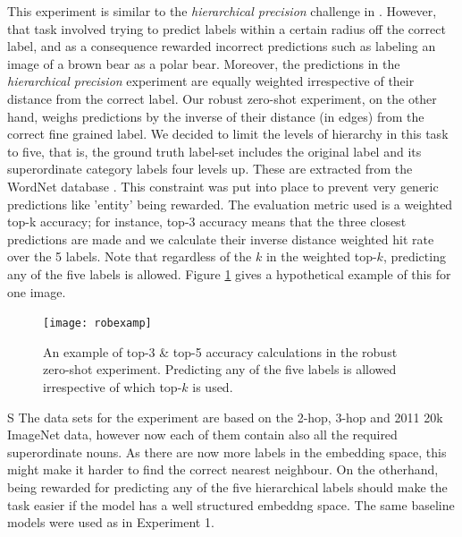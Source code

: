 \documentclass[12pt]{report}
\begin{document}
This experiment is similar to the \textit{hierarchical precision} challenge in \cite{Frome2013}. However, that task involved trying to predict labels within a certain radius off the correct label, and as a consequence rewarded incorrect predictions such as labeling an image of a brown bear as a polar bear. Moreover, the predictions in the \textit{hierarchical precision} experiment are equally weighted irrespective of their distance from the correct label. Our robust zero-shot experiment, on the other hand, weighs predictions by the inverse of their distance (in edges) from the correct fine grained label. We decided to limit the levels of hierarchy in this task to five, that is, the ground truth label-set includes the original label and its superordinate category labels four levels up. These are extracted from the WordNet database \cite{Miller1995}. This constraint was put into place to prevent very generic predictions like 'entity' being rewarded. The evaluation metric used is a weighted top-k accuracy; for instance,  top-$3$ accuracy means that the three closest predictions are made and we calculate their inverse distance weighted hit rate over the 5 labels. Note that regardless of the $k$ in the weighted top-$k$, predicting any of the five labels is allowed. Figure \ref{fig:robexp} gives a hypothetical example of this for one image. 
\begin{figure}
  \centering
  \texttt{[image: robexamp]}
  \caption{An example of top-3 \& top-5 accuracy calculations in the robust zero-shot experiment. Predicting any of the five labels is allowed irrespective of which top-$k$ is used.}
  \label{fig:robexp}
\end{figure}
S
The data sets for the experiment are based on the 2-hop, 3-hop and 2011 20k ImageNet data, however now each of them contain also all the required superordinate nouns. As there are now more labels in the embedding space, this might make it harder to find the correct nearest neighbour. On the otherhand, being rewarded for predicting any of the five hierarchical labels should make the task easier if the model has a well structured embeddng space. The same baseline models were used as in Experiment 1.
\end{document}
